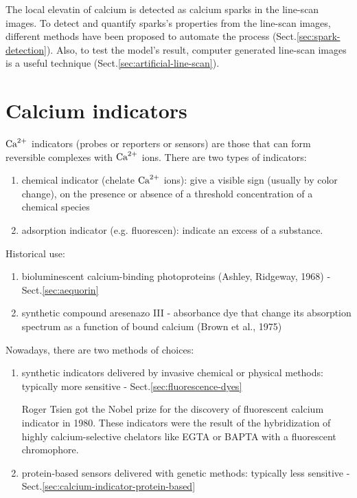 The local elevatin of calcium is detected as calcium sparks in the line-scan
images. To detect and quantify sparks's properties from the line-scan images,
different methods have been proposed to automate the process
(Sect.\ref{sec:spark-detection}). Also, to test the model's result, computer
generated line-scan images is a useful technique
(Sect.\ref{sec:artificial-line-scan}).

\section{Calcium indicators}
\label{sec:calcium-indicator}

${\text{Ca}^{2+}}$ indicators (probes or reporters or sensors) are those that can form
reversible complexes with ${\text{Ca}^{2+}}$ ions. There are two types of indicators:

  \begin{enumerate}
  \item chemical indicator (chelate ${\text{Ca}^{2+}}$ ions): give a visible sign
    (usually by color change), on the presence or absence of a
    threshold concentration of a chemical species

  \item adsorption indicator (e.g. fluorescen): indicate an excess of
    a substance.
  \end{enumerate}

Historical use:
\begin{enumerate}
  \item bioluminescent calcium-binding photoproteins (Ashley, Ridgeway, 1968) -
  Sect.\ref{sec:aequorin}
  
  \item synthetic compound aresenazo III - absorbance dye that change its
  absorption spectrum as a function of bound calcium (Brown et al., 1975)
\end{enumerate}


Nowadays, there are two methods of choices:
\begin{enumerate}
  \item  synthetic indicators delivered by invasive chemical or physical
methods: typically more sensitive - Sect.\ref{sec:fluorescence-dyes}  

Roger Tsien got the Nobel prize for the discovery of fluorescent calcium
indicator in 1980. These indicators were the result of the hybridization of
highly calcium-selective chelators like EGTA or BAPTA with a fluorescent
chromophore.


  \item protein-based sensors delivered with genetic methods: 
  typically less sensitive - Sect.\ref{sec:calcium-indicator-protein-based}
  
\end{enumerate}


